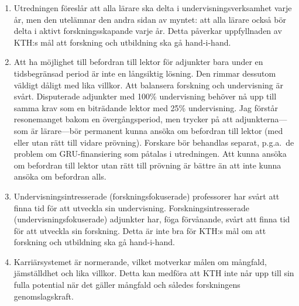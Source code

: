 \begin{enumerate}
  \item Utredningen föreslår att alla lärare ska delta i 
    undervisningsverksamhet varje år,
    men den utelämnar den andra sidan av myntet: att alla lärare också bör 
    delta i aktivt forskningsskapande varje år.
    Detta påverkar uppfyllnaden av KTH:s mål att forskning och utbildning ska 
    gå hand-i-hand.
  \item Att ha möjlighet till befordran till lektor för adjunkter bara under en 
    tidsbegränsad period är inte en långsiktig lösning.
    Den rimmar dessutom väldigt dåligt med lika villkor.
    Att balansera forskning och undervisning är svårt.
    Disputerade adjunkter med 100\% undervisning behöver nå upp till samma krav 
    som en biträdande lektor med 25\% undervisning.
    Jag förstår resonemanget bakom en övergångsperiod,
    men trycker på att adjunkterna---som är lärare---bör permanent kunna ansöka 
    om befordran till lektor (med eller utan rätt till vidare prövning).
    Forskare bör behandlas separat, p.g.a.\ de problem om GRU-finansiering som 
    påtalas i utredningen.
    Att kunna ansöka om befordran till lektor utan rätt till prövning är bättre 
    än att inte kunna ansöka om befordran alls.
  \item Undervisningsintresserade (forskningsfokuserade) professorer har svårt 
    att finna tid för att utveckla sin undervisning.
    Forskningsintresserade (undervisningsfokuserade) adjunkter har, föga 
    förvånande, svårt att finna tid för att utveckla sin forskning.
    Detta är inte bra för KTH:s mål om att forskning och utbildning ska gå 
    hand-i-hand.
  \item Karriärsystemet är normerande, vilket motverkar målen om mångfald, 
    jämställdhet och lika villkor.
    Detta kan medföra att KTH inte når upp till sin fulla potential när det 
    gäller mångfald och således forskningens genomslagskraft.
\end{enumerate}

